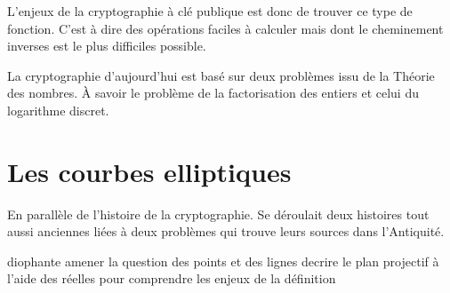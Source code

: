 L'enjeux de la cryptographie à clé publique est donc de trouver ce type de fonction.
C'est à dire des opérations faciles à calculer mais dont le cheminement inverses est le plus
difficiles possible.

La cryptographie d'aujourd'hui est basé sur deux problèmes issu de la Théorie des nombres. À
savoir le problème de la factorisation des entiers et celui du logarithme discret.

\section{Les courbes elliptiques}

En parallèle de l'histoire de la cryptographie. Se déroulait deux histoires tout aussi
anciennes liées à deux problèmes qui trouve leurs sources dans l'Antiquité.


diophante amener la question des points et des lignes
decrire le plan projectif à l'aide des réelles pour comprendre les enjeux de la définition











